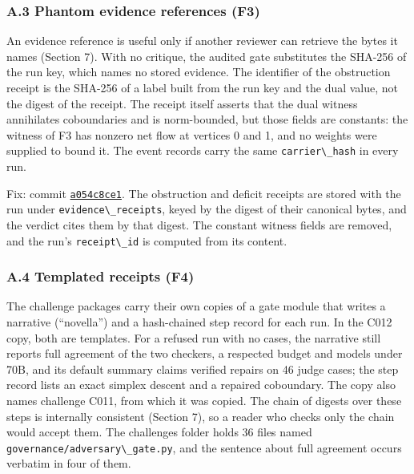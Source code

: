 \documentclass[
  11pt,
]{article}
\newcommand{\passthrough}[1]{#1}
\begin{document}
\hypertarget{a.3-phantom-evidence-references-f3}{%
\subsubsection{A.3 Phantom evidence references
(F3)}\label{a.3-phantom-evidence-references-f3}}

An evidence reference is useful only if another reviewer can retrieve
the bytes it names (Section 7). With no critique, the audited gate
substitutes the SHA-256 of the run key, which names no stored evidence.
The identifier of the obstruction receipt is the SHA-256 of a label
built from the run key and the dual value, not the digest of the
receipt. The receipt itself asserts that the dual witness annihilates
coboundaries and is norm-bounded, but those fields are constants: the
witness of F3 has nonzero net flow at vertices 0 and 1, and no weights
were supplied to bound it. The event records carry the same
\passthrough{\lstinline!carrier\_hash!} in every run.

Fix: commit
\href{https://github.com/dbccpage/the_symbol_game/commit/a054c8ce17c3025ac5518aaeef29096a299519bb}{\passthrough{\lstinline!a054c8ce1!}}.
The obstruction and deficit receipts are stored with the run under
\passthrough{\lstinline!evidence\_receipts!}, keyed by the digest of
their canonical bytes, and the verdict cites them by that digest. The
constant witness fields are removed, and the run's
\passthrough{\lstinline!receipt\_id!} is computed from its content.

\hypertarget{a.4-templated-receipts-f4}{%
\subsubsection{A.4 Templated receipts
(F4)}\label{a.4-templated-receipts-f4}}

The challenge packages carry their own copies of a gate module that
writes a narrative (``novella'') and a hash-chained step record for each
run. In the C012 copy, both are templates. For a refused run with no
cases, the narrative still reports full agreement of the two checkers, a
respected budget and models under 70B, and its default summary claims
verified repairs on 46 judge cases; the step record lists an exact
simplex descent and a repaired coboundary. The copy also names challenge
C011, from which it was copied. The chain of digests over these steps is
internally consistent (Section 7), so a reader who checks only the chain
would accept them. The challenges folder holds 36 files named
\passthrough{\lstinline!governance/adversary\_gate.py!}, and the sentence
about full agreement occurs verbatim in four of them.
\end{document}
